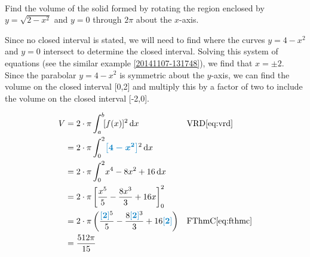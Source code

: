 \begin{example}[id:20141125-084541] \label{20141125-084541} \hfill \\

Find the volume of the solid formed by rotating the region enclosed by $y=\sqrt{2-x^2}$ and $y=0$ through $2\pi$ about the $x$-axis.

\soln
\solnsteps

Since no closed interval is stated, we will need to find where the curves $y=4-x^2$ and $y=0$ intersect to determine the closed interval.  Solving this system of equations (see the similar example \ref{20141107-131748}), we find that $x=\pm 2$. \\


Since the parabolar $y=4-x^2$ is symmetric about the $y$-axis, we can find the volume on the closed interval [0,2] and multiply this by a factor of two to include the volume on the closed interval [-2,0].
 
\soln

\solnsteps
\begin{align*}
V & = 2 \cdot \pi \displaystyle \int_{a}^{b} \! [f(x)]^2 \, \mathrm{d} x &&\text{VRD}\eqref{eq:vrd} \\
&= 2 \cdot \pi \displaystyle \int_{0}^{2} \! \farg{4-x^2}^2 \, \mathrm{d} x \\ %
&= 2 \cdot \pi \displaystyle \int_{0}^{2} \! x^4-8x^2+16 \, \mathrm{d} x  \\ %
&= 2 \cdot \pi \left[\dfrac{x^5}{5}-\dfrac{8x^3}{3}+16x \right]_{0}^{2} \\ %
&= 2 \cdot \pi \left( \dfrac{\farg{2}^5}{5}-\dfrac{8\farg{2}^3}{3}+16\farg{2} \right) && \text{FThmC} \eqref{eq:fthmc} \\
&= \dfrac{512 \pi}{15}
\end{align*}
\end{example}
